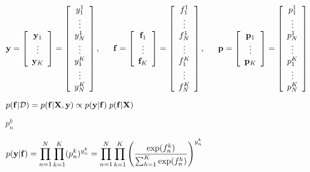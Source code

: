 \documentclass{article}
\def\lthtmlcheckvsize{\ifdim\ht\sizebox<\vsize 
  \ifdim\wd\sizebox<\hsize\expandafter\hfill\fi \expandafter\vfill
  \else\expandafter\vss\fi}%
\begin{document}
{\newpage\clearpage
{}%
$\displaystyle {\bf y}=\left[\begin{array}{c}{\bf y}_1\\\vdots\\{\bf y}_K\end{array}\right]
=\left[\begin{array}{c}y_1^1\\\vdots\\y_N^1\\\vdots\\y_1^K\\\vdots\\y_N^K\end{array}\right],\,\;\;\;\;\;
{\bf f}=\left[\begin{array}{c}{\bf f}_1\\\vdots\\{\bf f}_K\end{array}\right]
=\left[\begin{array}{c}f_1^1\\\vdots\\f_N^1\\\vdots\\f_1^K\\\vdots\\f_N^K\end{array}\right],\,\;\;\;\;\;
{\bf p}=\left[\begin{array}{c}{\bf p}_1\\\vdots\\{\bf p}_K\end{array}\right]
=\left[\begin{array}{c}p_1^1\\\vdots\\p_N^1\\\vdots\\p_1^K\\\vdots\\p_N^K\end{array}\right]$%
\lthtmlindisplaymathZ
\lthtmlcheckvsize\clearpage}

{\newpage\clearpage
{}%
$\displaystyle p({\bf f}|{\cal D})=p({\bf f}|{\bf X},{\bf y})
\propto p({\bf y}|{\bf f})\; p({\bf f}|{\bf X})$%
\lthtmlindisplaymathZ
\lthtmlcheckvsize\clearpage}

{\newpage\clearpage
{}%
$ p_n^k$%
\lthtmlindisplaymathZ
\lthtmlcheckvsize\clearpage}

{\newpage\clearpage
{}%
$\displaystyle p({\bf y}|{\bf f})=\prod_{n=1}^N\prod_{k=1}^K (p_n^k)^{y_n^k}
=\prod_{n=1}^N\prod_{k=1}^K
\left( \frac{\exp(f_n^k)}{\sum_{h=1}^K\exp(f_n^h)}\right)^{y_n^k}$%
\lthtmlindisplaymathZ
\lthtmlcheckvsize\clearpage}
\end{document}
